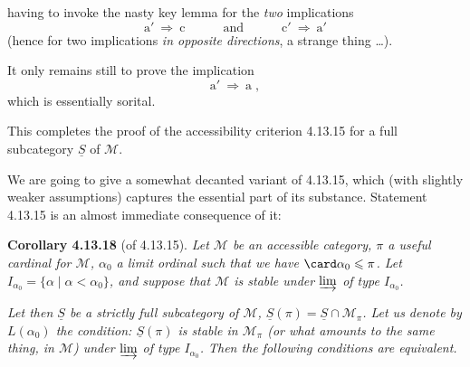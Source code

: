  having to invoke the nasty key lemma for the \textit{two} implications
\[
\mathrm{a}' \ \Longrightarrow \ \mathrm{c} \qquad\quad \text{and} \qquad\quad \mathrm{c}' \ \Longrightarrow \ \mathrm{a}'
\]
(hence for two implications \textit{in opposite directions}, a strange thing \dots).


It only remains still to prove the implication
\[
\mathrm{a}' \ \Longrightarrow \ \mathrm{a} \; ,
\]
which is essentially sorital.

This completes the proof of the accessibility criterion 4.13.15 for a full subcategory $\underline{S}$ of $\mathcal{M}$.

We are going to give a somewhat decanted variant of 4.13.15, which (with slightly weaker assumptions) captures the essential part of its substance. Statement 4.13.15 is an almost immediate consequence of it:



\textbf{Corollary 4.13.18} (of 4.13.15). \textit{Let $\mathcal{M}$ be an accessible category, $\pi$ a useful cardinal for $\mathcal{M}$, $\alpha_0$ a \textup{limit ordinal} such that we have $\card\alpha_0 \leqslant \pi$. Let $I_{\alpha_0} = \{\alpha \mid \alpha < \alpha_0\}$, and suppose that $\mathcal{M}$ is stable under $\varinjlim$ of type $I_{\alpha_0}$.}

\textit{Let then $\underline{S}$ be a strictly full subcategory of $\mathcal{M}$, $\underline{S}(\pi) = \underline{S}\cap\mathcal{M}_\pi$. Let us denote by $L(\alpha_0)$ the condition: $\underline{S}(\pi)$ is stable in $\mathcal{M}_\pi$ (or what amounts to the same thing, in $\mathcal{M}$) under $\varinjlim$ of type $I_{\alpha_0}$. Then the following conditions are equivalent.}

